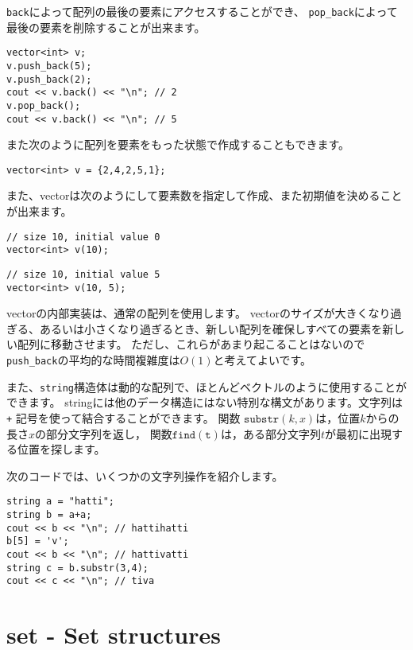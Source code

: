 \texttt{back}によって配列の最後の要素にアクセスすることができ、
\texttt{pop\_back}によって最後の要素を削除することが出来ます。

\begin{lstlisting}
vector<int> v;
v.push_back(5);
v.push_back(2);
cout << v.back() << "\n"; // 2
v.pop_back();
cout << v.back() << "\n"; // 5
\end{lstlisting}

また次のように配列を要素をもった状態で作成することもできます。

\begin{lstlisting}
vector<int> v = {2,4,2,5,1};
\end{lstlisting}

また、vectorは次のようにして要素数を指定して作成、また初期値を決めることが出来ます。

\begin{lstlisting}
// size 10, initial value 0
vector<int> v(10);
\end{lstlisting}
\begin{lstlisting}
// size 10, initial value 5
vector<int> v(10, 5);
\end{lstlisting}

vectorの内部実装は、通常の配列を使用します。
vectorのサイズが大きくなり過ぎる、あるいは小さくなり過ぎるとき、新しい配列を確保しすべての要素を新しい配列に移動させます。
ただし、これらがあまり起こることはないので\texttt{push\_back}の平均的な時間複雑度は$O(1)$と考えてよいです。


また、\texttt{string}構造体は動的な配列で、ほとんどベクトルのように使用することができます。
stringには他のデータ構造にはない特別な構文があります。文字列は \texttt{+} 記号を使って結合することができます。
関数 $\texttt{substr}(k,x)$は，位置$k$からの長さ$x$の部分文字列を返し，
関数$\texttt{find}(\texttt{t})$は，ある部分文字列$t$が最初に出現する位置を探します。

次のコードでは、いくつかの文字列操作を紹介します。

\begin{lstlisting}
string a = "hatti";
string b = a+a;
cout << b << "\n"; // hattihatti
b[5] = 'v';
cout << b << "\n"; // hattivatti
string c = b.substr(3,4);
cout << c << "\n"; // tiva
\end{lstlisting}

\section{set - Set structures}

